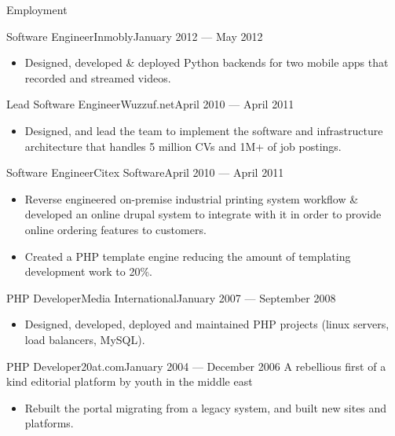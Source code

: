\documentclass[]{mosabcv}
\begin{document}
\begin{cvsection}{Employment}
  \begin{cvsubsection}{Software Engineer}{Inmobly}{January 2012 --- May 2012}
    \begin{itemize}
      \item Designed, developed \& deployed Python backends for two mobile apps
        that recorded and streamed videos.
    \end{itemize}
  \end{cvsubsection}

  \begin{cvsubsection}{Lead Software Engineer}{Wuzzuf.net}{April 2010 --- April
    2011}
    \begin{itemize}
      \item Designed, and lead the team to implement the software and
        infrastructure architecture that handles 5 million CVs and 1M+ of job
        postings.
    \end{itemize}
  \end{cvsubsection}

  \begin{cvsubsection}{Software Engineer}{Citex Software}{April 2010 --- April
    2011}
    \begin{itemize}
      \item Reverse engineered on-premise industrial printing system workflow \&
        developed an online drupal system to integrate with it in order to
        provide online ordering features to customers.
      \item Created a PHP template engine reducing the amount of templating
        development work to 20\%.
    \end{itemize}
  \end{cvsubsection}

  \begin{cvsubsection}{PHP Developer}{Media International}{January 2007 ---
    September 2008}
    \begin{itemize}
      \item Designed, developed, deployed and maintained PHP projects (linux
        servers, load balancers, MySQL).
    \end{itemize}
  \end{cvsubsection}

  \begin{cvsubsection}{PHP Developer}{20at.com}{January 2004 --- December 2006}
    A rebellious first of a kind editorial platform by youth in the middle east
    \begin{itemize}
      \item Rebuilt the portal migrating from a legacy system, and built new
        sites and platforms.
    \end{itemize}
  \end{cvsubsection}

\end{cvsection}
\end{document}
